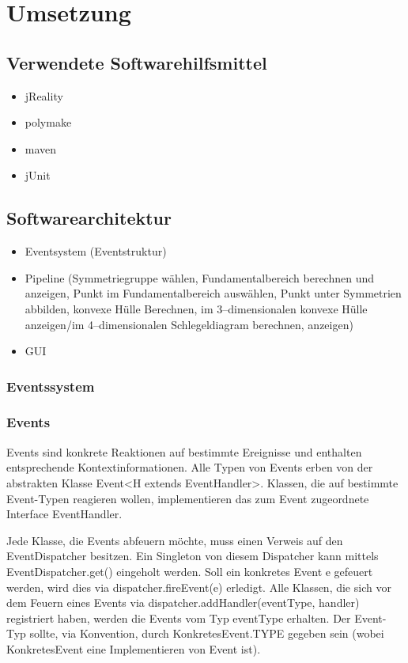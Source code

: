\section{Umsetzung}

\subsection{Verwendete Softwarehilfsmittel}
    \begin{itemize}
        \item jReality~\cite{jreality}
        \item polymake~\cite{polymake}
        \item maven~\cite{maven}
        \item jUnit
    \end{itemize}
    
\subsection{Softwarearchitektur}
    \begin{itemize}
        \item Eventsystem (Eventstruktur)
        \item Pipeline (Symmetriegruppe wählen, Fundamentalbereich berechnen und anzeigen, Punkt im Fundamentalbereich auswählen, Punkt unter Symmetrien abbilden, konvexe Hülle Berechnen, im 3--dimensionalen konvexe Hülle anzeigen/im 4--dimensionalen Schlegeldiagram berechnen, anzeigen)
        \item GUI
    \end{itemize}
    \subsubsection{Eventssystem}
        \subsubsection*{Events}
            Events sind konkrete Reaktionen auf bestimmte Ereignisse und enthalten entsprechende Kontextinformationen. Alle Typen von Events erben von der abstrakten Klasse Event<H extends EventHandler>. Klassen, die auf bestimmte Event-Typen reagieren wollen, implementieren das zum Event zugeordnete Interface EventHandler.

            Jede Klasse, die Events abfeuern möchte, muss einen Verweis auf den EventDispatcher besitzen. Ein Singleton von diesem Dispatcher kann mittels EventDispatcher.get() eingeholt werden. Soll ein konkretes Event e gefeuert werden, wird dies via dispatcher.fireEvent(e) erledigt. Alle Klassen, die sich vor dem Feuern eines Events via dispatcher.addHandler(eventType, handler) registriert haben, werden die Events vom Typ eventType erhalten. Der Event-Typ sollte, via Konvention, durch KonkretesEvent.TYPE gegeben sein (wobei KonkretesEvent eine Implementieren von Event ist).
